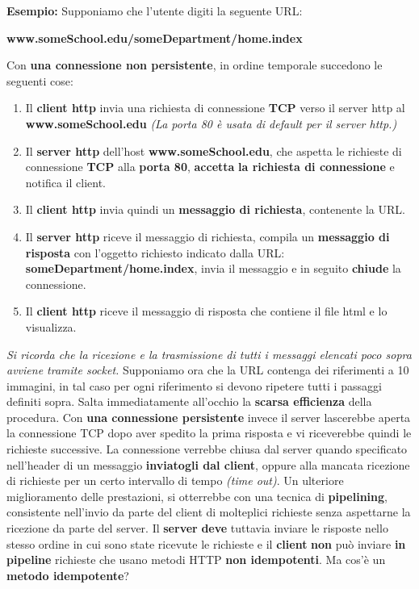 \documentclass[11pt,a4paper,oneside]{book}
\theoremstyle{definition}
\begin{document}
\textbf{Esempio:}\newline
Supponiamo che l’utente digiti la seguente URL:
\begin{center}
	\textbf{www.someSchool.edu/someDepartment/home.index}
\end{center}
Con \textbf{una connessione non persistente}, in ordine temporale succedono le seguenti cose:
\begin{enumerate}
	\item Il \textbf{client http}  invia una richiesta di connessione
	      \textbf{TCP} verso il server http al \textbf{www.someSchool.edu} \textit{(La porta 80 è usata di default per il server http.)}
	\item Il \textbf{server http} dell’host	\textbf{www.someSchool.edu}, che aspetta le richieste di connessione \textbf{TCP} alla \textbf{porta 80}, \textbf{accetta} \textbf{la richiesta di connessione}  e notifica il client.
	\item Il \textbf{client http} invia quindi un \textbf{messaggio di richiesta}, contenente la URL.
	\item Il \textbf{server http} riceve il messaggio di richiesta, compila un \textbf{messaggio di risposta} con l’oggetto richiesto indicato dalla URL: \textbf{someDepartment/home.index}, invia il messaggio e in seguito \textbf{chiude} la connessione.
	\item Il \textbf{client http}  riceve il messaggio di risposta che contiene il file html e lo visualizza.
\end{enumerate}
\textit{Si ricorda che la ricezione e la trasmissione di tutti i messaggi elencati poco sopra avviene tramite socket.}\newline
Supponiamo ora che la URL contenga dei riferimenti a 10 immagini, in tal caso per ogni riferimento si devono ripetere tutti i passaggi definiti sopra. Salta immediatamente all'occhio la \textbf{scarsa efficienza} della procedura.\newline\newline
Con \textbf{una connessione persistente} invece il server lascerebbe aperta la connessione TCP dopo aver spedito la prima risposta e vi riceverebbe quindi le richieste successive. La connessione verrebbe chiusa dal server quando specificato nell’header di un messaggio  \textbf{inviatogli dal client}, oppure alla mancata ricezione di richieste per un certo intervallo di tempo \textit{(time out)}.\newline\newline
Un ulteriore miglioramento delle prestazioni, si otterrebbe con una tecnica di \textbf{pipelining}, consistente nell’invio da parte del client di molteplici richieste senza aspettarne la ricezione da parte del server.\newline
Il \textbf{server} \textbf{deve} tuttavia inviare le risposte nello stesso ordine in cui sono state ricevute le richieste e il \textbf{client} \textbf{non} può inviare \textbf{in pipeline} richieste che usano metodi HTTP \textbf{non idempotenti}. Ma cos'è un \textbf{metodo idempotente}?
\theoremstyle{definition}
\end{document}
